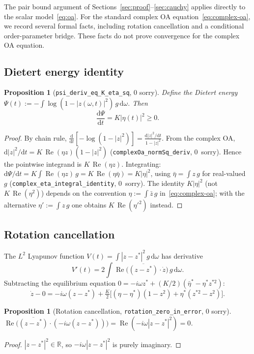 \documentclass[11pt,a4paper]{article}
\newtheorem{proposition}[theorem]{Proposition}
\theoremstyle{definition}
\DeclareMathOperator{\re}{Re}
\newcommand{\R}{\mathbb{R}}
\begin{document}
The pair bound argument of Sections~\ref{sec:proof}--\ref{sec:cauchy} applies directly to the scalar model~\eqref{eq:oa}. For the standard complex OA equation~\eqref{eq:complex-oa}, we record several formal facts, including rotation cancellation and a conditional order-parameter bridge. These facts do not prove convergence for the complex OA equation.

\subsection{Dietert energy identity}

\begin{proposition}[\texttt{psi\_deriv\_eq\_K\_eta\_sq}, 0 sorry]\label{prop:psi}
Define the Dietert energy $\Psi(t) := -\int \log(1-|z(\omega,t)|^2)\,g\,\mathrm{d}\omega$. Then
\[
\frac{\mathrm{d}\Psi}{\mathrm{d}t} = K|\eta(t)|^2 \geq 0.
\]
\end{proposition}
\begin{proof}
By chain rule, $\frac{\mathrm{d}}{\mathrm{d}t}[-\log(1-|z|^2)] = \frac{\mathrm{d}|z|^2/\mathrm{d}t}{1-|z|^2}$. From the complex OA, $\mathrm{d}|z|^2/\mathrm{d}t = K\,\re(\eta z)(1-|z|^2)$ (\texttt{complexOa\_normSq\_deriv}, 0~sorry). Hence the pointwise integrand is $K\,\re(\eta z)$. Integrating: $\mathrm{d}\Psi/\mathrm{d}t = K\int \re(\eta z)\,g = K\,\re(\eta\bar\eta) = K|\eta|^2$, using $\bar\eta = \int z\,g$ for real-valued~$g$ (\texttt{complex\_eta\_integral\_identity}, 0~sorry). The identity $K|\eta|^2$ (not $K\,\re(\eta^2)$) depends on the convention $\eta := \int \bar z\,g$ in~\eqref{eq:complex-oa}; with the alternative $\eta' := \int z\,g$ one obtains $K\,\re(\eta'^2)$ instead.
\end{proof}

\subsection{Rotation cancellation}

The $L^2$ Lyapunov function $V(t) = \int |z-z^*|^2\,g\,\mathrm{d}\omega$ has derivative
\[
V'(t) = 2\int \re\bigl(\overline{(z-z^*)}\cdot\dot z\bigr)\,g\,\mathrm{d}\omega.
\]
Subtracting the equilibrium equation $0 = -i\omega z^* + (K/2)(\bar\eta^* - \eta^* z^{*2})$:
\[
\dot z - 0 = -i\omega(z-z^*) + \tfrac{K}{2}\bigl[(\eta-\eta^*)(1-z^2) + \eta^*(z^{*2}-z^2)\bigr].
\]

\begin{proposition}[Rotation cancellation, \texttt{rotation\_zero\_in\_error}, 0 sorry]\label{prop:rotation}
$\re\bigl(\overline{(z-z^*)}\cdot(-i\omega(z-z^*))\bigr) = \re(-i\omega|z-z^*|^2) = 0$.
\end{proposition}
\begin{proof}
$|z-z^*|^2 \in \R$, so $-i\omega|z-z^*|^2$ is purely imaginary.
\end{proof}
\end{document}
